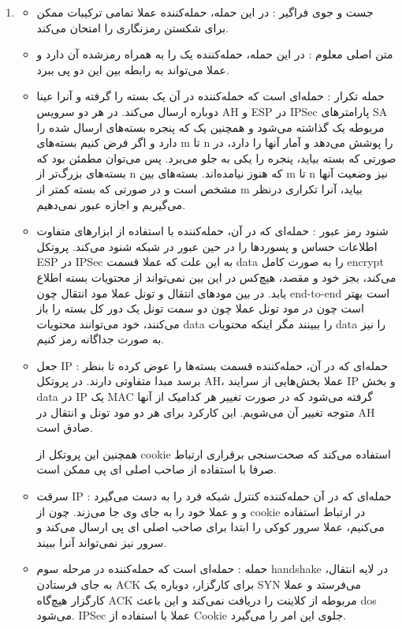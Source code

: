 \begin{enumerate}[label=\alph*)]
\item 
    \begin{itemize}
      \item جست و جوی فراگیر :
      در این حمله، حمله‌کننده عملا تمامی ترکیبات ممکن برای شکستن 
      رمزنگاری را امتحان می‌کند. 
      \item متن اصلی معلوم : 
      در این حمله، حمله‌کننده یک 
      را به همراه رمز‌شده آن دارد و عملا می‌تواند به رابطه بین این دو پی ببرد. 
      \item حمله تکرار : 
      حمله‌ای است که حمله‌کننده در آن یک بسته را گرفته
      و آنرا عینا دوباره ارسال می‌کند. در هر دو سرویس AH 
      و 
      ESP 
      در IPSec 
      پارامترهای SA 
      مربوطه یک 
      گذاشته می‌شود و همچنین یک 
      که پنجره بسته‌های ارسال شده را دارد و اگر فرض کنیم بسته‌های 
      m تا n را پوشش می‌دهد و آمار آنها را دارد، 
      در صورتی که بسته
      بیاید، پنجره را یکی به جلو می‌برد. پس می‌توان مطمئن بود که 
      بسته‌های 
      بزرگ‌تر از n که هنوز نیامده‌اند.
      بسته‌های بین m تا n نیز وضعیت آنها مشخص است و 
      در صورتی که بسته کمتر از m بیاید، آنرا تکراری درنظر می‌گیریم و 
      اجازه عبور نمی‌دهیم.
      \item شنود رمز عبور : 
      حمله‌ای که در آن، حمله‌کننده با استفاده از ابزارهای متفاوت 
      اطلاعات حساس و پسوردها را در حین عبور در شبکه شنود می‌کند. 
      پروتکل ESP در 
      IPSec 
      به این علت که عملا قسمت data را به صورت کامل 
      encrypt می‌کند، 
      بجز خود و مقصد،‌ هیچ‌‌کس در این بین نمی‌تواند از محتویات 
      بسته اطلاع یابد. در بین مودهای انتقال و 
      تونل عملا مود انتقال چون end-to-end است بهتر است چون 
      در مود تونل عملا چون دو سمت تونل یک دور کل بسته را باز می‌کنند، 
      خود می‌توانند محتویات data را ببینند مگر اینکه
      محتویات data را نیز به صورت جداگانه رمز کنیم.
      \item جعل IP : 
      حمله‌ای که در آن، حمله‌کننده قسمت 
      بسته‌ها را عوض کرده
      تا بنظر برسد مبدا متفاوتی دارند.
      در پروتکل 
      AH، 
      عملا بخش‌هایی از سرایند 
      IP
       و 
      بخش data در IP یک MAC گرفته می‌شود که در صورت
      تغییر هر کدامیک از آنها متوجه تغییر آن می‌شویم.
      این کارکرد برای هر دو مود تونل و انتقال در AH 
      صادق است.

      همچنین این پروتکل از cookie استفاده می‌کند که صحت‌سنجی برقراری ارتباط 
      صرفا با استفاده از صاحب اصلی ای پی ممکن است.
      \item سرقت IP : 
        حمله‌ای که در آن حمله‌کننده کنترل شبکه فرد را به دست می‌گیرد و 
        و عملا خود را به جای وی جا می‌زند.
        چون از cookie در ارتباط استفاده می‌کنیم، عملا سرور کوکی 
        را ابتدا برای صاحب اصلی ای پی ارسال می‌کند و سرور نیز نمی‌تواند آنرا ببیند.
      \item حمله  : 
      حمله‌ای است که حمله‌کننده در مرحله سوم handshake در لایه انتقال،‌ به جای فرستادن 
      ACK برای کارگزار،‌ دوباره یک SYN می‌فرستد و عملا 
      کارگزار هیچ‌گاه ACK مربوطه از کلاینت را دریافت نمی‌کند و این باعث dos می‌شود.
      IPSec عملا با استفاده از Cookie 
      جلوی این امر را می‌گیرد.
      


\end{itemize}
\end{enumerate}
